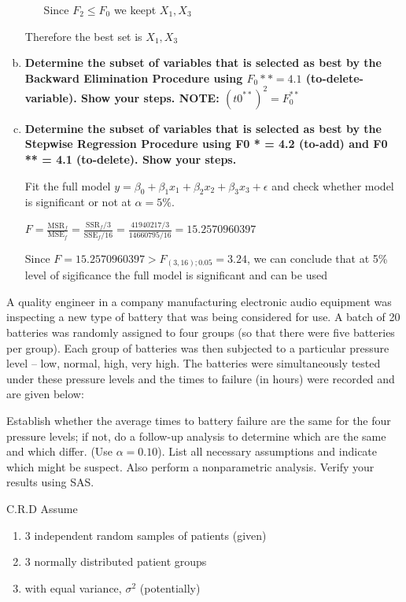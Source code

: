 \documentclass{article}
\begin{document}
\begin{enumerate}[(a)]
\begin{enumerate}[(1)]
Since $F_2 \leq F_0$ we keept $X_1, X_3$

\end{enumerate}

Therefore the best set is ${X_1, X_3}$

\item \textbf{Determine the subset of variables that is selected as best by the Backward Elimination
Procedure using $F_0** = 4.1$ (to-delete-variable). Show your steps.
NOTE: $( t0^{**} )^2 = F_0^{**}$}


\item \textbf{Determine the subset of variables that is selected as best by the Stepwise Regression
Procedure using F0
*
 = 4.2 (to-add) and F0
** = 4.1 (to-delete). Show your steps. }

Fit the full model $y = \beta_0 + \beta_1x_1 + \beta_2x_2 + \beta_3 x_3 + \epsilon$ and check whether model is significant or not at $\alpha=5\%$.

$F = \frac{\text{MSR}_f}{\text{MSE}_f} = \frac{\text{SSR}_f / 3}{\text{SSE}_f / 16} = \frac{ 41 940 217/3}{14 660 795/16} = 15.2570960397$

Since $F = 15.2570960397 > F_{(3, 16); 0.05} = 3.24$, we can conclude that at 5\% level of sigificance the full model is significant and can be used


\end{enumerate}

A quality engineer in a company manufacturing electronic audio equipment was inspecting
 a new type of battery that was being considered for use. A batch of 20 batteries was
 randomly assigned to four groups (so that there were five batteries per group). Each group
 of batteries was then subjected to a particular pressure level – low, normal, high, very
 high. The batteries were simultaneously tested under these pressure levels and the times
 to failure (in hours) were recorded and are given below: 

Establish whether the average times to battery failure are the same for the four pressure levels;
if not, do a follow-up analysis to determine which are the same and which differ. (Use $$).
List all necessary assumptions and indicate which might be suspect. Also perform a nonparametric analysis. Verify your results using SAS. 

C.R.D
Assume 
\begin{enumerate}[1]
\item 3 independent random samples of patients (given)
\item 3 normally distributed patient groups
\item with equal variance, $\sigma^2$ (potentially)
\end{enumerate}
\end{document}
